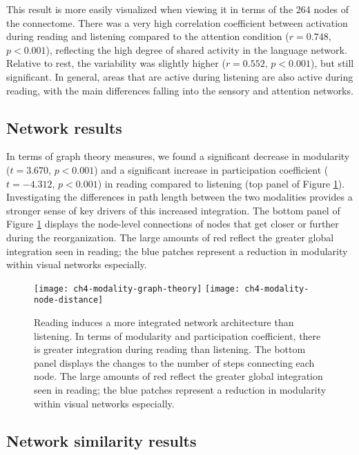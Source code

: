 This result is more easily visualized when viewing it in terms of the 264 nodes of the connectome. There was a very high correlation coefficient between activation during reading and listening compared to the attention condition ($r = 0.748$, $p < 0.001$), reflecting the high degree of shared activity in the language network. Relative to rest, the variability was slightly higher ($r = 0.552$, $p < 0.001$), but still significant. In general, areas that are active during listening are also active during reading, with the main differences falling into the sensory and attention networks. 

\subsection{Network results}

In terms of graph theory measures, we found a significant decrease in modularity ($t = 3.670$, $p < 0.001$) and a significant increase in participation coefficient ($t = -4.312$, $p < 0.001$) in reading compared to listening (top panel of Figure \ref{fig:ch4-modality-graph-theory}). Investigating the differences in path length between the two modalities provides a stronger sense of key drivers of this increased integration. The bottom panel of Figure \ref{fig:ch4-modality-graph-theory} displays the node-level connections of nodes that get closer or further during the reorganization. The large amounts of red reflect the greater global integration seen in reading; the blue patches represent a reduction in modularity within visual networks especially.

\begin{figure}[t!]
	\centering
	\texttt{[image: ch4-modality-graph-theory]}
	\texttt{[image: ch4-modality-node-distance]}
    \caption[Reading induces a more integrated network architecture than listening.]{Reading induces a more integrated network architecture than listening. In terms of modularity and participation coefficient, there is greater integration during reading than listening. The bottom panel displays the changes to the number of steps connecting each node. The large amounts of red reflect the greater global integration seen in reading; the blue patches represent a reduction in modularity within visual networks especially.}
	\label{fig:ch4-modality-graph-theory}
\end{figure}


\subsection{Network similarity results}

